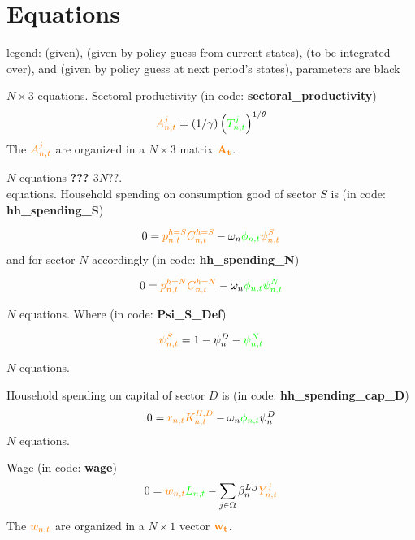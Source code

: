 \documentclass[12pt, bibtotoc, tablecaptionabove, figurecaptionabove, fleqn]{article}
\newcommand{\cl}[1]{{\color{orange}{#1}}}
\newcommand{\st}[1]{{\color{green}{#1}}}
\newcommand{\stnext}[1]{{\color{magenta}{#1}}}
\newcommand{\clnext}[1]{{\color{blue}{#1}}}
\begin{document}
\section{Equations}

legend: \st{states in green} (given), \cl{controls in orange} (given by policy guess from current states), \stnext{next period's exogenous states in magenta} (to be integrated over), and \clnext{next period's controls in blue} (given by policy guess at next period's states), parameters are black\vspace{5mm}

\noindent $N \times 3$ equations. Sectoral productivity (in code: {\bf{sectoral\_productivity}})
\begin{equation}
\cl{A_{n, t}^{j}}=(1 / \gamma)\left(\st{T_{n, t}^{j}}\right)^{1 / \theta}
\end{equation}
The $\cl{A^j_{n,t}}$ are organized in a $ N \times 3$ matrix $\mathbf{\cl{A_t}}$.

\noindent $N$ equations {\bf{??? $3N??$}}.\\

 equations. Household spending on consumption good of sector $S$ is (in code: {\bf{hh\_spending\_S}}) 

\begin{equation}
0 = \cl{p^{h=S}_{n,t}} \cl{C^{h=S}_{n,t}} - \omega_n \st{\phi_{n,t}} \cl{\psi_{n,t}^S}
\end{equation}
and for sector $N$ accordingly (in code: {\bf{hh\_spending\_N}})

\begin{equation}
0 = \cl{p^{h=N}_{n,t}} \cl{C^{h=N}_{n,t}} - \omega_n \st{\phi_{n,t}} \st{\psi_{n,t}^N}
\end{equation}

\noindent $N $ equations. Where (in code: {\bf{Psi\_S\_Def}})

\begin{equation}
\cl{\psi_{n,t}^S} = 1 - \psi^D_n - \st{\psi_{n,t}^N}
\end{equation}

\noindent $N $ equations. 

Household spending on capital of sector $D$ is (in code: {\bf{hh\_spending\_cap\_D}})
\begin{equation}
0 = \cl{r_{n, t}} \cl{K_{n, t}^{H,D}} - \omega_n \st{\phi_{n,t}} \psi^D_n
\end{equation}
\noindent $N $ equations. 

Wage (in code: {\bf{wage}})
\begin{equation}
0 = \cl{w_{n, t}} \st{L_{n, t}} -\sum_{j \in \Omega} \beta_{n}^{L, j} \cl{Y_{n, t}^{j}}
\end{equation}
The $\cl{w_{n,t}}$ are organized in a $ N \times 1$ vector $\mathbf{\cl{w_t}}$.
\end{document}
